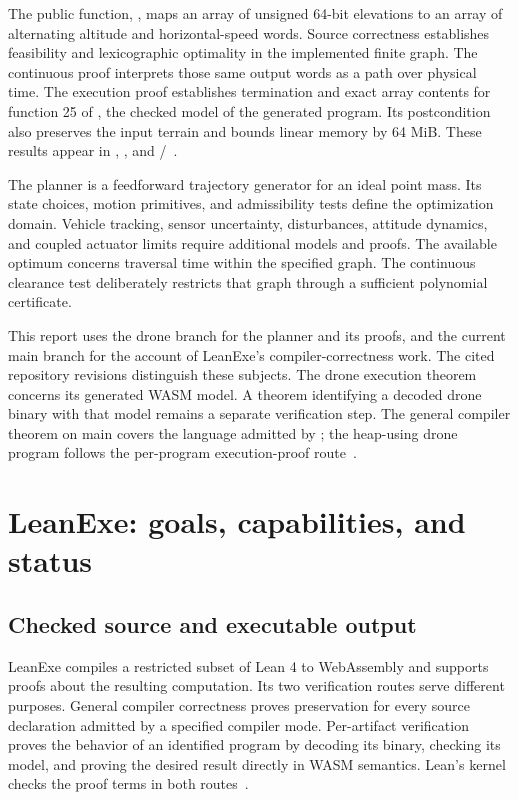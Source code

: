 \documentclass[11pt]{article}
\begin{document}
The public function, , maps an array of unsigned 64-bit elevations to an array of alternating altitude and horizontal-speed words.  Source correctness establishes feasibility and lexicographic optimality in the implemented finite graph.  The continuous proof interprets those same output words as a path over physical time.  The execution proof establishes termination and exact array contents for function 25 of , the checked model of the generated program.  Its postcondition also preserves the input terrain and bounds linear memory by 64 MiB.  These results appear in , , and /~\cite{drone-source,drone-proofs}.

The planner is a feedforward trajectory generator for an ideal point mass.  Its state choices, motion primitives, and admissibility tests define the optimization domain.  Vehicle tracking, sensor uncertainty, disturbances, attitude dynamics, and coupled actuator limits require additional models and proofs.  The available optimum concerns traversal time within the specified graph.  The continuous clearance test deliberately restricts that graph through a sufficient polynomial certificate.

This report uses the drone branch for the planner and its proofs, and the current main branch for the account of LeanExe's compiler-correctness work.  The cited repository revisions distinguish these subjects.  The drone execution theorem concerns its generated WASM model.  A theorem identifying a decoded drone binary with that model remains a separate verification step.  The general compiler theorem on main covers the language admitted by ; the heap-using drone program follows the per-program execution-proof route~\cite{drone-record,compiler-correctness}.

\section{LeanExe: goals, capabilities, and status}
\label{sec:leanexe}

\subsection{Checked source and executable output}

LeanExe compiles a restricted subset of Lean 4 to WebAssembly and supports proofs about the resulting computation.  Its two verification routes serve different purposes.  General compiler correctness proves preservation for every source declaration admitted by a specified compiler mode.  Per-artifact verification proves the behavior of an identified program by decoding its binary, checking its model, and proving the desired result directly in WASM semantics.  Lean's kernel checks the proof terms in both routes~\cite{lean,leanexe-main,compiler-correctness}.
\end{document}
